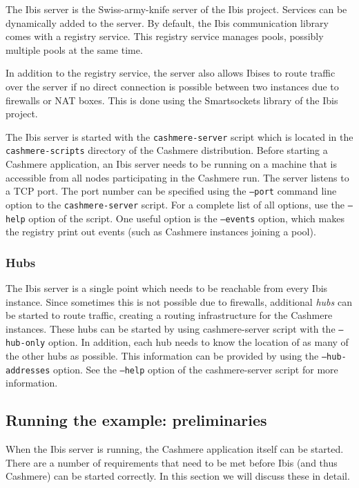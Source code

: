 \documentclass[a4paper,10pt]{article}
\begin{document}
The Ibis server is the Swiss-army-knife server of the Ibis project.
Services can be dynamically added to the server. By default, the Ibis
communication library comes with a registry service. This registry
service manages pools, possibly multiple pools at the same time.

In addition to the registry service, the server also allows
Ibises to route traffic over the server if no direct connection is
possible between two instances due to firewalls or NAT boxes. This is
done using the Smartsockets library of the Ibis project.

The Ibis server is started with the \texttt{cashmere-server} script which is
located in the \texttt{cashmere-scripts} directory of the Cashmere distribution.
Before starting a Cashmere application, an Ibis server needs to be running on a
machine that is accessible from all nodes participating in the Cashmere run.
The server listens to a TCP port. The port number can be specified using
the \texttt{--port} command line option to the \texttt{cashmere-server}
script.  For a complete list of all options, use the \texttt{--help}
option of the script. One useful option is the  \texttt{--events}
option, which makes the registry print out events (such as Cashmere instances
joining a pool).

\subsubsection{Hubs}
\label{hubs}

The Ibis server is a single point which needs to be reachable from every
Ibis instance. Since sometimes this is not possible due to firewalls,
additional \emph{hubs} can be started to route traffic, creating a
routing infrastructure for the Cashmere instances. These hubs can be started
by using cashmere-server script with the \texttt{--hub-only} option. In
addition, each hub needs to know the location of as many of the other
hubs as possible. This information can be provided by using the
\texttt{--hub-addresses} option. See the \texttt{--help} option of the
cashmere-server script for more information.

\subsection{Running the example: preliminaries}

When the Ibis server is running, the Cashmere application itself can be
started.  There are a number of requirements that need to be met before
Ibis (and thus Cashmere) can be started correctly.
In this section we will discuss these in detail.
\end{document}

